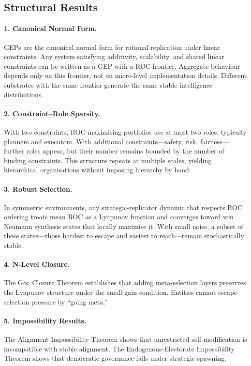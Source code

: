 \documentclass[12pt]{article}
\begin{document}
\subsection{Structural Results}

\paragraph{1. Canonical Normal Form.} GEPs are the canonical normal form for rational replication under linear constraints. Any system satisfying additivity, scalability, and shared linear constraints can be written as a GEP with a ROC frontier. Aggregate behaviour depends only on this frontier, not on micro-level implementation details. Different substrates with the same frontier generate the same stable intelligence distributions.

\paragraph{2. Constraint--Role Sparsity.} With two constraints, ROC-maximising portfolios use at most two roles, typically planners and executors. With additional constraints---safety, risk, fairness---further roles appear, but their number remains bounded by the number of binding constraints. This structure repeats at multiple scales, yielding hierarchical organisations without imposing hierarchy by hand.

\paragraph{3. Robust Selection.} In symmetric environments, any strategic-replicator dynamic that respects ROC ordering treats mean ROC as a Lyapunov function and converges toward von Neumann synthesis states that locally maximise it. With small noise, a subset of these states---those hardest to escape and easiest to reach---remain stochastically stable.

\paragraph{4. N-Level Closure.} The G$\infty$ Closure Theorem establishes that adding meta-selection layers preserves the Lyapunov structure under the small-gain condition. Entities cannot escape selection pressure by ``going meta.''

\paragraph{5. Impossibility Results.} The Alignment Impossibility Theorem shows that unrestricted self-modification is incompatible with stable alignment. The Endogenous-Electorate Impossibility Theorem shows that democratic governance fails under strategic spawning.
\end{document}
